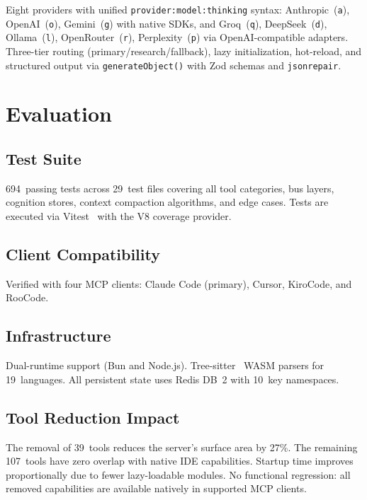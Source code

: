 \documentclass[journal,10pt]{IEEEtran}
\newcommand{\code}[1]{\texttt{#1}}
\begin{document}
Eight providers with unified \code{provider:model:thinking} syntax: Anthropic~(\code{a}), OpenAI~(\code{o}), Gemini~(\code{g}) with native SDKs, and Groq~(\code{q}), DeepSeek~(\code{d}), Ollama~(\code{l}), OpenRouter~(\code{r}), Perplexity~(\code{p}) via OpenAI-compatible adapters. Three-tier routing (primary/research/fallback), lazy initialization, hot-reload, and structured output via \code{generateObject()} with Zod schemas and \code{jsonrepair}.

\section{Evaluation}
\label{sec:eval}

\subsection{Test Suite}

694~passing tests across 29~test files covering all tool categories, bus layers, cognition stores, context compaction algorithms, and edge cases. Tests are executed via Vitest~\cite{vitest} with the V8 coverage provider.

\subsection{Client Compatibility}

Verified with four MCP clients: Claude Code (primary), Cursor, KiroCode, and RooCode.

\subsection{Infrastructure}

Dual-runtime support (Bun and Node.js). Tree-sitter~\cite{treesitter} WASM parsers for 19~languages. All persistent state uses Redis DB~2 with 10~key namespaces.

\subsection{Tool Reduction Impact}

The removal of 39~tools reduces the server's surface area by 27\%. The remaining 107~tools have zero overlap with native IDE capabilities. Startup time improves proportionally due to fewer lazy-loadable modules. No functional regression: all removed capabilities are available natively in supported MCP clients.
\end{document}

